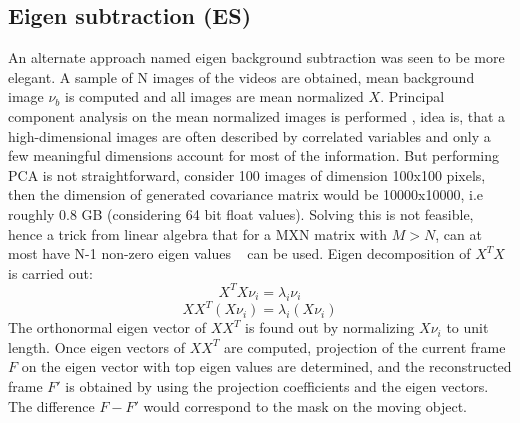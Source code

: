 \subsection{Eigen subtraction (ES)}
An alternate approach named eigen background subtraction was seen to be more elegant. A sample of N images of the videos are obtained, mean background image $\nu_b$ is computed and all images are mean normalized  $X$. Principal component analysis on the mean normalized images is performed , idea is, that a high-dimensional images are often described by correlated variables and only a few meaningful dimensions account for most of the information. But performing PCA is not straightforward, consider 100 images of dimension 100x100 pixels, then the dimension of generated covariance matrix would be 10000x10000, i.e roughly 0.8 GB (considering 64 bit float values). Solving this is not feasible, hence a trick from linear algebra that for a MXN matrix with $M>N$, can at most have N-1 non-zero eigen values ~\cite{Duda01} can be used. Eigen decomposition of $X^TX$ is carried out:
$$X^TX\nu_i=\lambda_i\nu_i$$
$$XX^T(X\nu_i)=\lambda_i(X\nu_i)$$
The orthonormal eigen vector of $XX^T$ is found out by normalizing $X\nu_i$ to unit length. Once eigen vectors of $XX^T$  are computed, projection of the current frame $F$ on the eigen vector with top eigen values are determined, and the reconstructed frame $F'$ is obtained by using the projection coefficients and the eigen vectors. The difference $F-F'$ would correspond to the mask on the moving object. 


